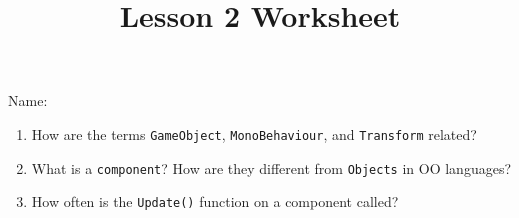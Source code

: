 \documentclass[12pt]{../rhitcsse}
\title{Lesson 2 Worksheet}
\begin{document}
\maketitle

\vspace*{0.15in}\hspace{0.25in}Name:\hrulefill\hspace{0.25in}\hspace{0.25in}

\begin{enumerate}
  \item How are the terms \texttt{GameObject}, \texttt{MonoBehaviour}, and \texttt{Transform} related? 
  \vfill

  \item What is a \texttt{component}? How are they different from \texttt{Objects} in OO languages?
  \vfill

  \item How often is the \texttt{Update()} function on a component called? 
  \vfill
  

\end{enumerate}
\end{document}
